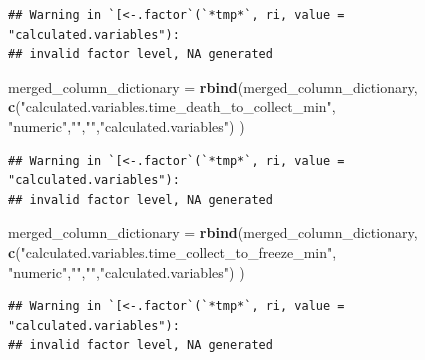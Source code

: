 \documentclass[]{article}
\newenvironment{Shaded}{\begin{snugshade}}{\end{snugshade}}
\newcommand{\KeywordTok}[1]{\textcolor[rgb]{0.13,0.29,0.53}{\textbf{#1}}}
\newcommand{\StringTok}[1]{\textcolor[rgb]{0.31,0.60,0.02}{#1}}
\newcommand{\NormalTok}[1]{#1}
\begin{document}
\begin{verbatim}
## Warning in `[<-.factor`(`*tmp*`, ri, value = "calculated.variables"):
## invalid factor level, NA generated
\end{verbatim}

\begin{Shaded}
\begin{Highlighting}[]
\NormalTok{merged_column_dictionary =}\StringTok{ }\KeywordTok{rbind}\NormalTok{(merged_column_dictionary,}
  \KeywordTok{c}\NormalTok{(}\StringTok{"calculated.variables.time_death_to_collect_min"}\NormalTok{,}
    \StringTok{"numeric"}\NormalTok{,}\StringTok{""}\NormalTok{,}\StringTok{""}\NormalTok{,}\StringTok{"calculated.variables"}\NormalTok{)}
\NormalTok{)}
\end{Highlighting}
\end{Shaded}

\begin{verbatim}
## Warning in `[<-.factor`(`*tmp*`, ri, value = "calculated.variables"):
## invalid factor level, NA generated
\end{verbatim}

\begin{Shaded}
\begin{Highlighting}[]
\NormalTok{merged_column_dictionary =}\StringTok{ }\KeywordTok{rbind}\NormalTok{(merged_column_dictionary,}
  \KeywordTok{c}\NormalTok{(}\StringTok{"calculated.variables.time_collect_to_freeze_min"}\NormalTok{,}
    \StringTok{"numeric"}\NormalTok{,}\StringTok{""}\NormalTok{,}\StringTok{""}\NormalTok{,}\StringTok{"calculated.variables"}\NormalTok{)}
\NormalTok{)}
\end{Highlighting}
\end{Shaded}

\begin{verbatim}
## Warning in `[<-.factor`(`*tmp*`, ri, value = "calculated.variables"):
## invalid factor level, NA generated
\end{verbatim}
\end{document}
